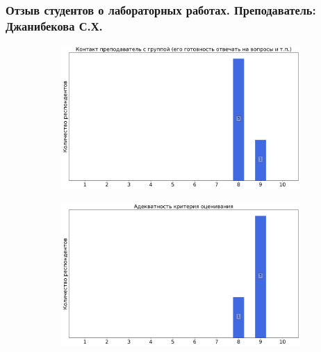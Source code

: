     \subsubsection{Отзыв студентов о лабораторных работах. Преподаватель: Джанибекова С.Х.}
		\begin{figure}[H]
			\centering
			\begin{subfigure}[b]{0.45\textwidth}
				\centering
				\includegraphics[width=\textwidth]{images/1 course/Общая физика - механика/labniks-marks-Джанибекова С.Х.-0.png}
			\end{subfigure}
			\begin{subfigure}[b]{0.45\textwidth}
				\centering
				\includegraphics[width=\textwidth]{images/1 course/Общая физика - механика/labniks-marks-Джанибекова С.Х.-1.png}
			\end{subfigure}
			\begin{subfigure}[b]{0.45\textwidth}
				\centering

\end{subfigure}
\end{figure}
